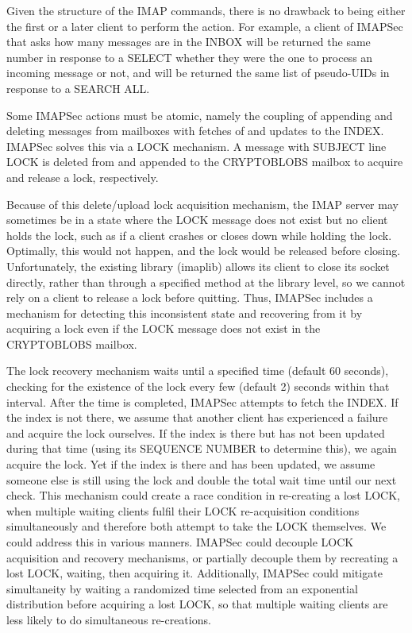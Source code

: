 \documentclass[pageno]{jpaper}
\newcommand{\project}{IMAPSec }
\begin{document}
Given the structure of the IMAP commands, there is no drawback to being either the first or a later client to perform the action. For example, a client of \project that asks how many messages are in the INBOX will be returned the same number in response to a SELECT whether they were the one to process an incoming message or not, and will be returned the same list of pseudo-UIDs in response to a SEARCH ALL.

Some \project actions must be atomic, namely the coupling of appending and deleting messages from mailboxes with fetches of and updates to the INDEX. \project solves this via a LOCK mechanism. A message with SUBJECT line LOCK is deleted from and appended to the CRYPTOBLOBS mailbox to acquire and release a lock, respectively.

Because of this delete/upload lock acquisition mechanism, the IMAP server may sometimes be in a state where the LOCK message does not exist but no client holds the lock, such as if a client crashes or closes down while holding the lock. Optimally, this would not happen, and the lock would be released before closing. Unfortunately, the existing library (imaplib) allows its client to close its socket directly, rather than through a specified method at the library level, so we cannot rely on a client to release a lock before quitting. Thus, \project includes a mechanism for detecting this inconsistent state and recovering from it by acquiring a lock even if the LOCK message does not exist in the CRYPTOBLOBS mailbox.

The lock recovery mechanism waits until a specified time (default 60 seconds), checking for the existence of the lock every few (default 2) seconds within that interval. After the time is completed, \project attempts to fetch the INDEX. If the index is not there, we assume that another client has experienced a failure and acquire the lock ourselves. If the index is there but has not been updated during that time (using its SEQUENCE NUMBER to determine this), we again acquire the lock. Yet if the index is there and has been updated, we assume someone else is still using the lock and double the total wait time until our next check. This mechanism could create a race condition in re-creating a lost LOCK, when multiple waiting clients fulfil their LOCK re-acquisition conditions simultaneously and therefore both attempt to take the LOCK themselves. We could address this in various manners. \project could decouple LOCK acquisition and recovery mechanisms, or partially decouple them by recreating a lost LOCK, waiting, then acquiring it. Additionally, \project could mitigate simultaneity by waiting a randomized time selected from an exponential distribution before acquiring a lost LOCK, so that multiple waiting clients are less likely to do simultaneous re-creations.
\end{document}
